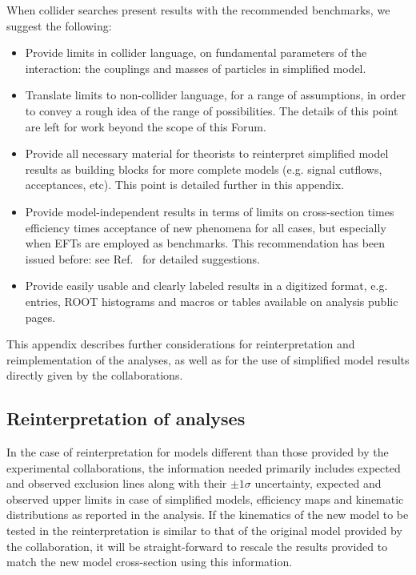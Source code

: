  When collider searches present results with the recommended benchmarks, we suggest the following:
 \begin{itemize}
 \item Provide limits in collider language, on fundamental parameters of
 the interaction: the couplings and masses of particles in simplified model.
 \item Translate limits to non-collider language, for a range of
 assumptions, in order to convey a rough idea of the range of
 possibilities. The details of this point are left for work beyond the scope of this Forum. 
 \item Provide all necessary material for theorists to reinterpret simplified
 model results as building blocks for more complete models (e.g. signal cutflows,
 acceptances, etc). This point is detailed further in this appendix.
\item Provide model-independent results in terms of limits on
  cross-section times efficiency times acceptance of new phenomena for all cases, but
  especially when EFTs are employed as benchmarks. This recommendation has been issued before: see
  Ref.~\cite{Kraml:2012sg} for detailed suggestions.
 \item Provide easily usable and clearly labeled results in a digitized format, e.g.~\cite{HEPData_doc} entries, ROOT histograms and macros
 or tables available on analysis public pages.
 \end{itemize}

This appendix describes further considerations for reinterpretation and reimplementation of the analyses, 
as well as for the use of simplified model results directly given by the collaborations. 

\subsection{Reinterpretation of analyses}

In the case of reinterpretation for models different than those provided by the experimental collaborations,
the information needed primarily includes expected and observed exclusion lines along with their $\pm 1 \sigma$ uncertainty, 
expected and observed upper limits in case of simplified models, efficiency maps and kinematic distributions
as reported in the analysis. If the kinematics of the new model to be tested in the reinterpretation is similar to that 
of the original model provided by the collaboration, it
will be straight-forward to rescale the results provided to match the new model cross-section
using this information. 

